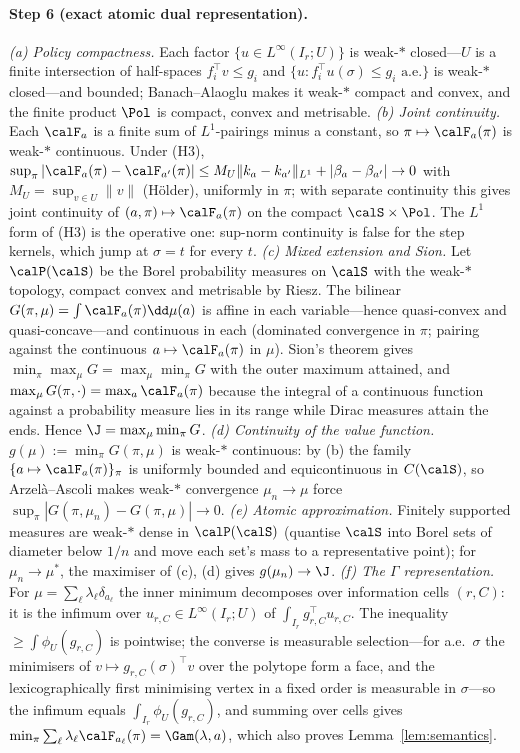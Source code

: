 \paragraph{Step 6 (exact atomic dual representation).}
\emph{(a) Policy compactness.} Each factor $\{u\in L^\infty(I_r;U)\}$ is weak-$\ast$ closed---$U$ is a finite intersection of half-spaces $f_i^\top v\le g_i$ and $\{u:f_i^\top u(\sigma)\le g_i\text{ a.e.}\}$ is weak-$\ast$ closed---and bounded; Banach--Alaoglu makes it weak-$\ast$ compact and convex, and the finite product $\Pol$ is compact, convex and metrisable.
\emph{(b) Joint continuity.} Each $\calF_a$ is a finite sum of $L^1$-pairings minus a constant, so $\pi\mapsto\calF_a(\pi)$ is weak-$\ast$ continuous. Under (H3), $\sup_\pi|\calF_a(\pi)-\calF_{a'}(\pi)|\le M_U\|k_a-k_{a'}\|_{L^1}+|\beta_a-\beta_{a'}|\to0$ with $M_U=\sup_{v\in U}\|v\|$ (H\"older), uniformly in $\pi$; with separate continuity this gives joint continuity of $(a,\pi)\mapsto\calF_a(\pi)$ on the compact $\calS\times\Pol$. The $L^1$ form of (H3) is the operative one: sup-norm continuity is false for the step kernels, which jump at $\sigma=t$ for every $t$.
\emph{(c) Mixed extension and Sion.} Let $\calP(\calS)$ be the Borel probability measures on $\calS$ with the weak-$\ast$ topology, compact convex and metrisable by Riesz. The bilinear $G(\pi,\mu)=\int\calF_a(\pi)\dd\mu(a)$ is affine in each variable---hence quasi-convex and quasi-concave---and continuous in each (dominated convergence in $\pi$; pairing against the continuous $a\mapsto\calF_a(\pi)$ in $\mu$). Sion's theorem \cite{Sion1958} gives $\min_\pi\max_\mu G=\max_\mu\min_\pi G$ with the outer maximum attained, and $\max_\mu G(\pi,\cdot)=\max_a\calF_a(\pi)$ because the integral of a continuous function against a probability measure lies in its range while Dirac measures attain the ends. Hence $\J=\max_\mu\min_\pi G$.
\emph{(d) Continuity of the value function.} $g(\mu):=\min_\pi G(\pi,\mu)$ is weak-$\ast$ continuous: by (b) the family $\{a\mapsto\calF_a(\pi)\}_\pi$ is uniformly bounded and equicontinuous in $C(\calS)$, so Arzel\`a--Ascoli makes weak-$\ast$ convergence $\mu_n\to\mu$ force $\sup_\pi|G(\pi,\mu_n)-G(\pi,\mu)|\to0$.
\emph{(e) Atomic approximation.} Finitely supported measures are weak-$\ast$ dense in $\calP(\calS)$ (quantise $\calS$ into Borel sets of diameter below $1/n$ and move each set's mass to a representative point); for $\mu_n\to\mu^\ast$, the maximiser of (c), (d) gives $g(\mu_n)\to\J$.
\emph{(f) The $\Gamma$ representation.} For $\mu=\sum_\ell\lambda_\ell\delta_{a_\ell}$ the inner minimum decomposes over information cells $(r,C)$: it is the infimum over $u_{r,C}\in L^\infty(I_r;U)$ of $\int_{I_r}g_{r,C}^\top u_{r,C}$. The inequality $\ge\int\phi_U(g_{r,C})$ is pointwise; the converse is measurable selection---for a.e.\ $\sigma$ the minimisers of $v\mapsto g_{r,C}(\sigma)^\top v$ over the polytope form a face, and the lexicographically first minimising vertex in a fixed order is measurable in $\sigma$---so the infimum equals $\int_{I_r}\phi_U(g_{r,C})$, and summing over cells gives $\min_\pi\sum_\ell\lambda_\ell\calF_{a_\ell}(\pi)=\Gam(\lambda,a)$, which also proves Lemma~\ref{lem:semantics}.
